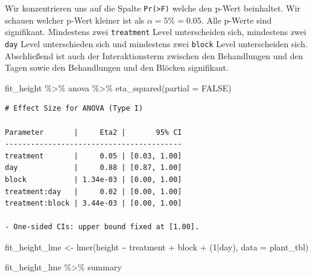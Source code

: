 \documentclass[
  letterpaper,
]{scrbook}
\newenvironment{Shaded}{\begin{snugshade}}{\end{snugshade}}
\newcommand{\AttributeTok}[1]{\textcolor[rgb]{0.40,0.45,0.13}{#1}}
\newcommand{\ConstantTok}[1]{\textcolor[rgb]{0.56,0.35,0.01}{#1}}
\newcommand{\DecValTok}[1]{\textcolor[rgb]{0.68,0.00,0.00}{#1}}
\newcommand{\FunctionTok}[1]{\textcolor[rgb]{0.28,0.35,0.67}{#1}}
\newcommand{\NormalTok}[1]{\textcolor[rgb]{0.00,0.23,0.31}{#1}}
\newcommand{\OtherTok}[1]{\textcolor[rgb]{0.00,0.23,0.31}{#1}}
\newcommand{\SpecialCharTok}[1]{\textcolor[rgb]{0.37,0.37,0.37}{#1}}
\begin{document}
Wir konzentrieren uns auf die Spalte \texttt{Pr(\textgreater{}F)} welche
den p-Wert beinhaltet. Wir schauen welcher p-Wert kleiner ist als
\(\alpha = 5\% = 0.05\). Alle p-Werte sind signifikant. Mindestens zwei
\texttt{treatment} Level unterscheiden sich, mindestens zwei
\texttt{day} Level unterschieden sich und mindestens zwei \texttt{block}
Level unterscheiden sich. Abschließend ist auch der Interaktionsterm
zwischen den Behandlungen und den Tagen sowie den Behandlungen und den
Blöcken signifikant.

\begin{Shaded}
\begin{Highlighting}[]
\NormalTok{fit\_height }\SpecialCharTok{\%\textgreater{}\%}\NormalTok{ anova }\SpecialCharTok{\%\textgreater{}\%} \FunctionTok{eta\_squared}\NormalTok{(}\AttributeTok{partial =} \ConstantTok{FALSE}\NormalTok{)}
\end{Highlighting}
\end{Shaded}

\begin{verbatim}
# Effect Size for ANOVA (Type I)

Parameter       |     Eta2 |       95% CI
-----------------------------------------
treatment       |     0.05 | [0.03, 1.00]
day             |     0.88 | [0.87, 1.00]
block           | 1.34e-03 | [0.00, 1.00]
treatment:day   |     0.02 | [0.00, 1.00]
treatment:block | 3.44e-03 | [0.00, 1.00]

- One-sided CIs: upper bound fixed at [1.00].
\end{verbatim}

\begin{Shaded}
\begin{Highlighting}[]
\NormalTok{fit\_height\_lme }\OtherTok{\textless{}{-}} \FunctionTok{lmer}\NormalTok{(height }\SpecialCharTok{\textasciitilde{}}\NormalTok{ treatment }\SpecialCharTok{+}\NormalTok{ block }\SpecialCharTok{+}\NormalTok{ (}\DecValTok{1}\SpecialCharTok{|}\NormalTok{day), }
                       \AttributeTok{data =}\NormalTok{ plant\_tbl)}

\NormalTok{fit\_height\_lme }\SpecialCharTok{\%\textgreater{}\%}\NormalTok{ summary}
\end{Highlighting}
\end{Shaded}
\end{document}
